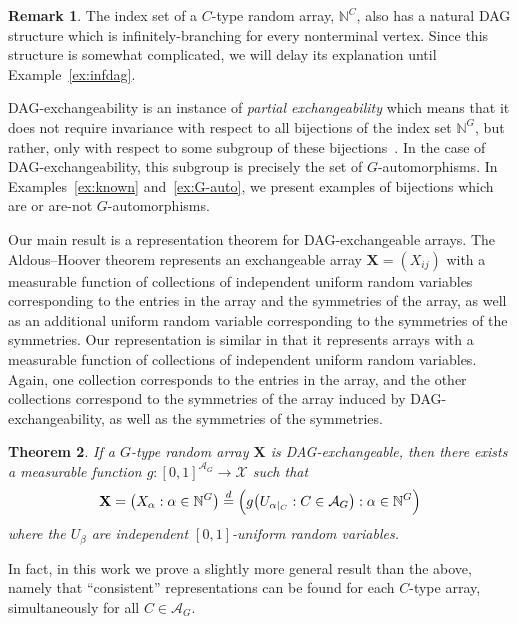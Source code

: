 \documentclass[10pt]{amsart}
\newtheorem{theo}{Theorem}[section]
\theoremstyle{definition}\newtheorem{defi}[theo]{Definition}\newtheorem{rema}[theo]{Remark}\newtheorem{exam}[theo]{Example}\newtheorem{exem}[theo]{Example}\newtheorem{nota}[theo]{Notation}
\newcommand{\indices}[1]{\mathbb{N}^{#1}}
\renewcommand{\d}{\buildrel{d}\over{=}}
\renewcommand{\AA}{\mathcal{A}}
\newcommand*\XX{{\mathcal{X}}}
\newcommand*\bX{\mathbf{X}}
\begin{document}
\begin{rema}
The index set of a $C$-type random array, $\mathbb{N}^C$, also has a natural DAG structure which is infinitely-branching for every nonterminal vertex. Since this structure is somewhat complicated, we will delay its explanation until Example~\ref{ex:infdag}.
\end{rema}

DAG-exchangeability is an instance of \emph{partial exchangeability} which means that it does not require invariance with respect to all bijections of the index set $\mathbb{N}^G$, but rather, only with respect to some subgroup of these bijections~\cite{aldous1985exchangeability}. In the case of DAG-exchangeability, this subgroup is precisely the set of $G$-automorphisms. In Examples~\ref{ex:known} and~\ref{ex:G-auto}, we present examples of bijections which are or are-not $G$-automorphisms.

Our main result is a representation theorem for DAG-exchangeable arrays. The Aldous--Hoover theorem represents an exchangeable array $\bX = (X_{ij})$ with a measurable function of collections of independent uniform random variables corresponding to the entries in the array and the symmetries of the array, as well as an additional uniform random variable corresponding to the symmetries of the symmetries. Our representation is similar in that it represents arrays with a measurable function of collections of independent uniform random variables. Again, one collection corresponds to the entries in the array, and the other collections correspond to the symmetries of the array induced by DAG-exchangeability, as well as the symmetries of the symmetries.

\begin{theo}\label{cor 2}
If a $G$-type random array $\bX$ is DAG-exchangeable, then there exists a measurable function $g: [0,1]^{\AA_G} \to \XX$ such that
\begin{equation}\label{eqn: representation}
\bX = \left(X_\alpha : \alpha \in \indices G\right) \d \Big(g\big(U_{\alpha|_C} : C \in \AA_G\big) : \alpha \in \indices G\Big)
\end{equation}
where the $U_\beta$ are independent $[0,1]$-uniform random variables.
\end{theo}

In fact, in this work we prove a slightly more general result than the above, namely that ``consistent'' representations can be found for each $C$-type array, simultaneously for all $C\in\AA_G$.
\end{document}
